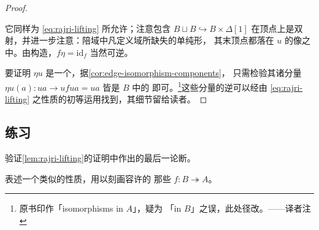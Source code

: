 \begin{proof}
\begin{center}
\end{center}
它同样为 \eqref{eq:rajri-lifting} 所允许；注意包含 $B\sqcup B\hookrightarrow B\times\Delta[1]$ 在顶点上是双射，并进一步注意：陪域中凡定义域所缺失的单纯形，
其末顶点都落在 $u$ 的像之中。由构造，$f\eta=\mathrm{id}_{f}$ 当然可逆。

要证明 $\eta u$ 是一个\trIsomorphism，据\cref{cor:edge-isomorphism-components}，
只需检验其诸分量 $\eta u(a)\colon ua\to ufua=ua$ 皆是 $B$ 中的%
\trIsomorphism{}即可。\footnote{原书印作「isomorphisms in $A$」，疑为
「in $B$」之误，此处径改。——译者注}这些分量的逆\trIsomorphism{}可以经由
\eqref{eq:rajri-lifting} 之\trLifting{}性质的初等运用找到，其细节留给读者。
\end{proof}

\subsection*{练习}

\begin{exercise}\label{ex:rajri-composite}
验证\cref{lem:rajri-lifting}的证明中作出的最后一论断。
\end{exercise}

\begin{exercise}\label{ex:lari-lifting-analog}
表述一个类似的\trLifting{}性质，用以刻画容许\trLeftAdjoint\trRightInverse{}的
那些\trIsofibration{} $f\colon B\twoheadrightarrow A$。
\end{exercise}


